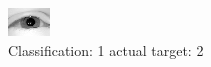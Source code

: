 \begin{figure}[h!]
\begin{center}
\includegraphics[width=0.60\columnwidth]{figures/ID2348_class_1_target_2.png}
\end{center}
\caption{ Classification: 1 actual target: 2}
\label{fig:ID2348_class_1_target_2}
\end{figure}
